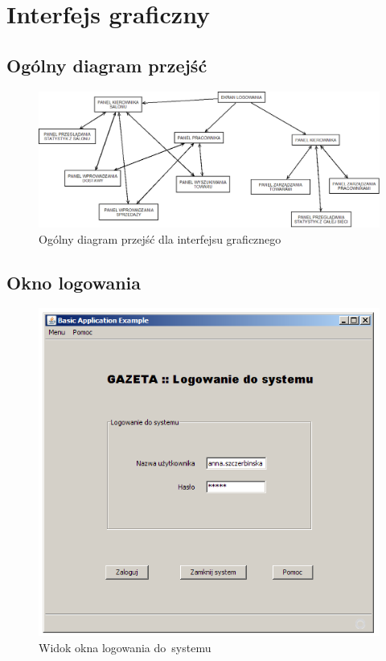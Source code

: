 \section{Interfejs graficzny}
\subsection{Ogólny diagram przejść}
\begin{figure}[h]
\includegraphics[width=1\textwidth]{gfx/diagram_przejsc.png}
\caption{Ogólny diagram przejść dla interfejsu graficznego}
\end{figure}
\clearpage
\subsection{Okno logowania}
\begin{figure}[h]
\includegraphics[width=1\textwidth]{gfx/logowanie.png}
\caption{Widok okna logowania do~systemu}
\end{figure}
\clearpage
